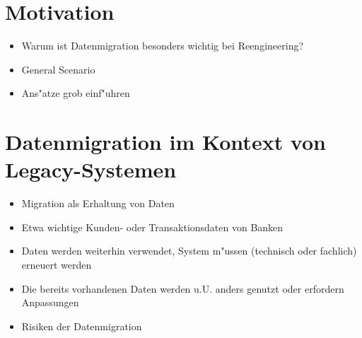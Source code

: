 \documentclass[11pt]{scrartcl}
\begin{document}
\section{Motivation}

\begin{itemize}
	\item Warum ist Datenmigration besonders wichtig bei Reengineering?
	\item General Scenario
	\item Ans"atze grob einf"uhren
\end{itemize}

\section{Datenmigration im Kontext von Legacy-Systemen}


\begin{itemize}
	\item Migration als Erhaltung von Daten
	\item Etwa wichtige Kunden- oder Transaktionsdaten von Banken
	\item Daten werden weiterhin verwendet, System m"ussen (technisch oder fachlich) erneuert werden
	\item Die bereits vorhandenen Daten werden u.U. anders genutzt oder erfordern Anpassungen
	\item Risiken der Datenmigration
\end{itemize}
\end{document}
